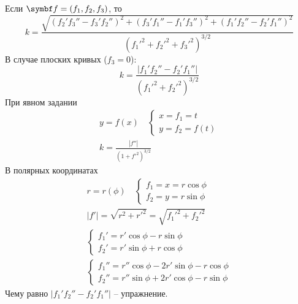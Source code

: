 \documentclass[main]{subfiles}
\begin{document}
Если $\vf = (f_1, f_2, f_3)$, то
\[k = \frac{\sqrt{(f_2'f_3'' - f_3' f_2'')^2 + (f_3'f_1'' - f_1' f_3'')^2 + (f_1'f_2'' - f_2' f_1'')^2}}{(f_1'^2 + f_2'^2 + f_3'^2)^{3/2}}\]
В случае плоских кривых ($f_3 = 0$):
\[k = \frac{|f_1'f_2'' - f_2' f_1''|}{(f_1'^2 + f_2'^2)^{3/2}}\]
При явном задании
\begin{gather*}
    y = f(x) \quad \begin{cases}
        x = f_1 = t \\
        y = f_2 = f(t)
    \end{cases}\\
    k = \frac{|f''|}{(1+ f'^2)^{3/2}}
\end{gather*}
В полярных координатах
\begin{gather*}
    r = r(\phi) \quad \begin{cases}
        f_1 = x = r \cos \phi \\
        f_2 = y = r \sin \phi
    \end{cases}\\
    |f'| = \sqrt{r^2 + r'^2} = \sqrt{f_1'^2 + f_2'^2}\\
    \begin{cases}
        f_1' = r' \cos \phi - r \sin \phi \\
        f_2' = r' \sin \phi + r \cos \phi
    \end{cases}\\
    \begin{cases}
        f_1'' = r'' \cos \phi - 2 r' \sin \phi - r \cos \phi \\
        f_2'' = r'' \sin \phi + 2 r' \cos \phi - r \sin \phi
    \end{cases}
\end{gather*}
Чему равно $|f_1'f_2'' - f_2' f_1''|$ -- упражнение.
\end{document}
